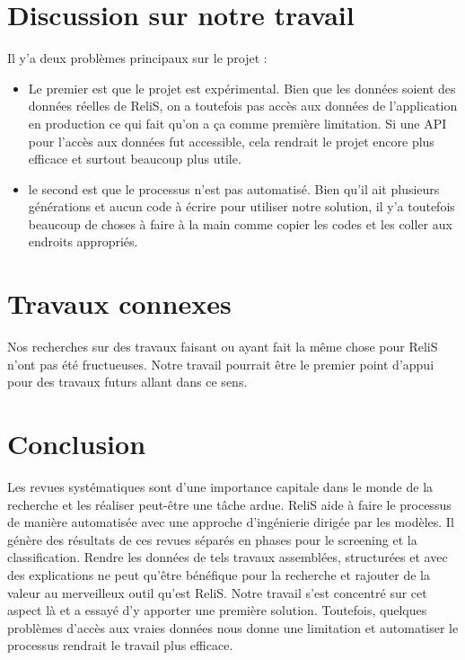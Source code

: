 \section{Discussion sur notre travail}

Il y'a deux problèmes principaux sur le projet :
\begin{itemize}
    \item Le premier est que le projet est expérimental. Bien que les données soient des données réelles de ReliS, on a toutefois pas accès aux données de l'application en production ce qui fait qu'on a ça comme première limitation. Si une API pour l'accès aux données fut accessible, cela rendrait le projet encore plus efficace et surtout beaucoup plus utile.
    \item le second est que le processus n'est pas automatisé. Bien qu'il ait plusieurs générations et aucun code à écrire pour utiliser notre solution, il y'a toutefois beaucoup de choses à faire à la main comme copier les codes et les coller aux endroits appropriés.
    \end{itemize}
\vspace*{4mm}
\newpage
\section{Travaux connexes}

Nos recherches sur des travaux faisant ou ayant fait la même chose pour ReliS n'ont pas été fructueuses. Notre travail pourrait être le premier point d'appui pour des travaux futurs allant dans ce sens.
\newpage
\section{Conclusion}
\vspace*{0.4cm}
\hspace*{0.8cm}
Les revues systématiques sont d'une importance capitale dans le monde de la recherche et les réaliser peut-être une tâche ardue. ReliS aide à faire le processus de manière automatisée avec une approche d'ingénierie dirigée par les modèles. Il génère des résultats de ces revues séparés en phases pour le screening et la classification.
Rendre les données de tels travaux assemblées, structurées et avec des explications ne peut qu'être bénéfique pour la recherche et rajouter de la valeur au merveilleux outil qu'est ReliS. 
Notre travail s'est concentré sur cet aspect là et a essayé d'y apporter une première solution. Toutefois, quelques problèmes d'accès aux vraies données nous donne une limitation et automatiser le processus rendrait le travail plus efficace.

\newpage

\printbibliography


